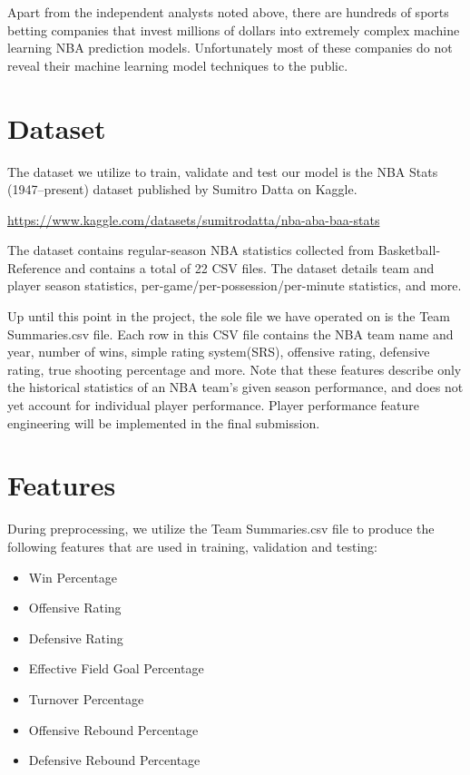 \documentclass[11pt]{article}
\begin{document}
Apart from the independent analysts noted above, there are hundreds of sports betting companies that invest millions of dollars into extremely complex machine learning NBA prediction models. Unfortunately most of these companies do not reveal their machine learning model techniques to the public.




\section{Dataset}


The dataset we utilize to train, validate and test our model is the NBA Stats (1947–present) dataset published by Sumitro Datta on Kaggle.

\url{https://www.kaggle.com/datasets/sumitrodatta/nba-aba-baa-stats}
\medskip

The dataset contains regular-season NBA statistics collected from Basketball-Reference and contains a total of 22 CSV files. The dataset details team and player season statistics, per-game/per-possession/per-minute statistics, and more.
\medskip

Up until this point in the project, the sole file we have operated on is the Team Summaries.csv file. Each row in this CSV file contains the NBA team name and year, number of wins, simple rating system(SRS), offensive rating, defensive rating, true shooting percentage and more. Note that these features describe only the historical statistics of an NBA team's given season performance, and does not yet account for individual player performance. Player performance feature engineering will be implemented in the final submission.

\section{Features}


During preprocessing, we utilize the Team Summaries.csv file to produce the following features that are used in training, validation and testing:
\begin{itemize}
\item Win Percentage
\item Offensive Rating
\item Defensive Rating
\item Effective Field Goal Percentage
\item Turnover Percentage
\item Offensive Rebound Percentage
\item Defensive Rebound Percentage
\end{itemize}
\end{document}
